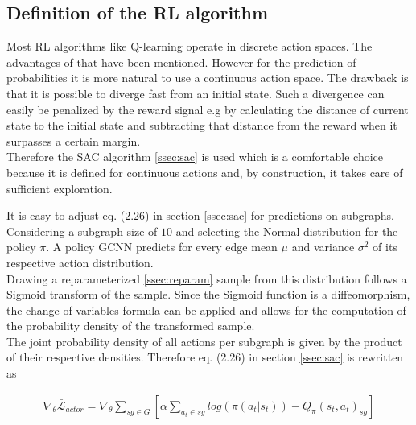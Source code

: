 \subsection{Definition of the RL algorithm}
Most RL algorithms like Q-learning operate in discrete action spaces. The advantages of that have been mentioned. However for the prediction of probabilities it is more natural to use a continuous action space. The drawback is that it is possible to diverge fast from an initial state. Such a divergence can easily be penalized by the reward signal e.g by calculating the distance of current state to the initial state and subtracting that distance from the reward when it surpasses a certain margin. \\
Therefore the SAC algorithm \ref{ssec:sac} is used which is a comfortable choice because it is defined for continuous actions and, by construction, it takes care of sufficient exploration. 

It is easy to adjust eq. (2.26) in section \ref{ssec:sac} for predictions on subgraphs. Considering a subgraph size of $10$ and selecting the Normal distribution for the policy $\pi$. A policy GCNN predicts for every edge mean $\mu$ and variance $\sigma ^2$ of its respective action distribution. \\
Drawing a reparameterized \ref{ssec:reparam} sample from this distribution follows a Sigmoid transform of the sample. Since the Sigmoid function is a diffeomorphism, the change of variables formula \cite{papamakarios2019normalizing} can be applied and allows for the computation of the probability density of the transformed sample. \\
The joint probability density of all actions per subgraph is given by the product of their respective densities. Therefore eq. (2.26) in section \ref{ssec:sac} is rewritten as

\begin{align}
	\nabla_\theta \bar{\mathcal{L}}_{actor} = \nabla_\theta \sum_{sg \in G} \left[ \alpha \sum_{a_t\in sg}log(\pi(a_t|s_t)) - Q_\pi(s_t, a_t)_{sg} \right]
\end{align}

